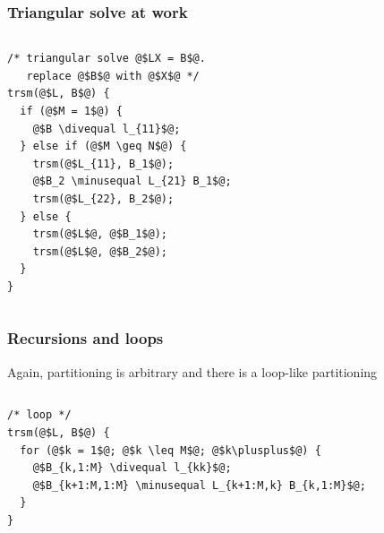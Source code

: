 \documentclass[12pt,dvipdfmx]{beamer}
\newcommand{\minusequal}{\mbox{\tt\ -= }}
\newcommand{\divequal}{\mbox{\tt\ /= }}
\newcommand{\plusplus}{\mbox{\tt\ ++ }}
\begin{document}
\begin{frame}[fragile]
\frametitle{Triangular solve at work}

\begin{columns}[t]
\begin{column}{0.4\textwidth}
\begin{lstlisting}[basicstyle=\scriptsize]
/* triangular solve @$LX = B$@. 
   replace @$B$@ with @$X$@ */
trsm(@$L, B$@) {
  if (@$M = 1$@) {
    @$B \divequal l_{11}$@;
  } else if (@$M \geq N$@) {
    trsm(@$L_{11}, B_1$@);
    @$B_2 \minusequal L_{21} B_1$@;
    trsm(@$L_{22}, B_2$@);
  } else {
    trsm(@$L$@, @$B_1$@);
    trsm(@$L$@, @$B_2$@);
  }
}
\end{lstlisting}
\end{column}

\begin{column}{0.6\textwidth}
\begin{center}
\def\svgwidth{\textwidth}
%
\only<2>{}%
\only<3>{}%
%
\end{center}
\end{column}
\end{columns}
\end{frame}

\begin{frame}[fragile]
\frametitle{Recursions and loops}
Again, partitioning is arbitrary and there is a loop-like 
partitioning


\begin{columns}[t]
\begin{column}{0.55\textwidth}
\begin{lstlisting}[basicstyle=\scriptsize]
/* loop */
trsm(@$L, B$@) {
  for (@$k = 1$@; @$k \leq M$@; @$k\plusplus$@) {
    @$B_{k,1:M} \divequal l_{kk}$@;
    @$B_{k+1:M,1:M} \minusequal L_{k+1:M,k} B_{k,1:M}$@;
  }
}
\end{lstlisting}
\end{column}

\begin{column}{0.45\textwidth}
\begin{center}
\def\svgwidth{\textwidth}
%
\only<2>{}%
\only<3>{}%
\only<4>{}%
\only<5>{}%
%
%
%
%
\end{center}
\end{column}
\end{columns}
\end{frame}
\end{document}
